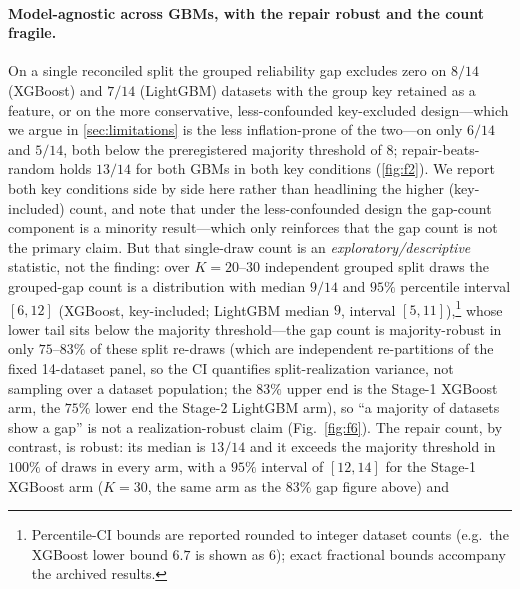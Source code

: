 \documentclass[pdflatex,sn-mathphys-num]{sn-jnl}
\begin{document}
\paragraph{Model-agnostic across GBMs, with the repair robust and the count fragile.}
On a single reconciled split the grouped reliability gap excludes zero on $8/14$
(XGBoost) and $7/14$ (LightGBM) datasets with the group key retained as a feature, or on the more conservative,
less-confounded key-excluded design---which we argue in \cref{sec:limitations} is the less
inflation-prone of the two---on only $6/14$ and $5/14$, both below the preregistered majority threshold
of $8$; repair-beats-random holds $13/14$ for both GBMs in both key conditions
(\cref{fig:f2}). We report both key conditions side by side here rather than headlining the higher
(key-included) count, and note that under the less-confounded design the gap-count component is a
minority result---which only reinforces that the gap count is not the primary claim.
But that single-draw
count is an \emph{exploratory/descriptive} statistic, not the finding: over $K{=}20$--$30$ independent grouped
split draws the grouped-gap count is a
distribution with median $9/14$ and $95\%$ percentile interval $[6,12]$ (XGBoost, key-included; LightGBM
median $9$, interval $[5,11]$),\footnote{Percentile-CI bounds are reported rounded to integer dataset counts
(e.g.\ the XGBoost lower bound $6.7$ is shown as $6$); exact fractional bounds accompany the archived results.} whose lower tail sits below the majority threshold---the gap count is
majority-robust in only $75$--$83\%$ of these split re-draws (which are independent re-partitions of
the fixed 14-dataset panel, so the CI quantifies split-realization variance, not sampling over a
dataset population; the $83\%$ upper end is the Stage-1 XGBoost arm, the $75\%$
lower end the Stage-2 LightGBM arm), so ``a majority of datasets show a gap'' is not a
realization-robust claim (Fig.~\ref{fig:f6}). The repair count, by contrast, is robust: its median is $13/14$
and it exceeds the majority threshold in $100\%$ of draws in every arm, with a $95\%$ interval of
$[12,14]$ for the Stage-1 XGBoost arm ($K{=}30$, the same arm as the $83\%$ gap figure above) and
\end{document}

